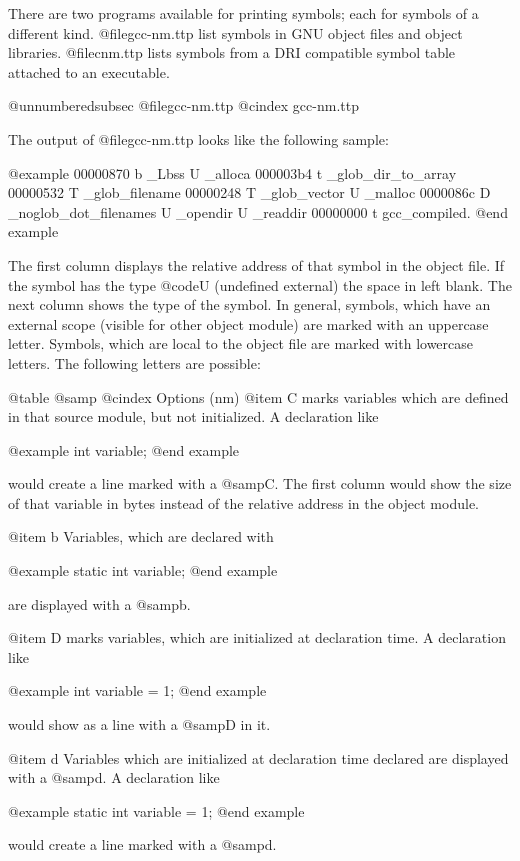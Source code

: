 {{{{{There are two programs available for printing symbols; each for symbols
of a different kind. @file{gcc-nm.ttp} list symbols in GNU object files
and object libraries. @file{cnm.ttp} lists symbols from a DRI compatible
symbol table attached to an executable.

@unnumberedsubsec @file{gcc-nm.ttp}
@cindex gcc-nm.ttp

The output of @file{gcc-nm.ttp} looks like the following sample:

@example
00000870 b _Lbss
         U _alloca
000003b4 t _glob_dir_to_array
00000532 T _glob_filename
00000248 T _glob_vector
         U _malloc
0000086c D _noglob_dot_filenames
         U _opendir
         U _readdir
00000000 t gcc_compiled.
@end example

The first column displays the relative address of that symbol in
the object file. If the symbol has the type @code{U} (undefined
external) the space in left blank. The next column shows the type
of the symbol. In general, symbols, which have an external scope
(visible for other object module) are marked with an uppercase
letter. Symbols, which are local to the object file are marked
with lowercase letters. The following letters are possible:

@table @samp
@cindex Options (nm)
@item C
marks variables which are defined in that source module, but not
initialized. A declaration like

@example
int variable;
@end example

would create a line marked with a @samp{C}. The first column would 
show the size of that variable in bytes instead of the relative 
address in the object module.

@item b
Variables, which are declared with

@example
static int variable;
@end example

are displayed with a @samp{b}.

@item D
marks variables, which are initialized at declaration time. A
declaration like

@example
int variable = 1;
@end example

would show as a line with a @samp{D} in it.

@item d
Variables which are initialized at declaration time declared are
displayed with a @samp{d}. A declaration like

@example
static int variable = 1;
@end example

would create a line marked with a @samp{d}.

}}}}}
